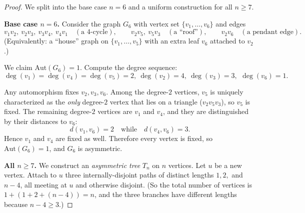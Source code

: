 \documentclass[12pt,a4paper,openany]{book}
\begin{document}
\begin{proof}
We split into the base case $n=6$ and a uniform construction for all $n\ge 7$.

\smallskip
\noindent\textbf{Base case $n=6$.} 
Consider the graph $G_6$ with vertex set $\{v_1,\dots,v_6\}$ and edges
\[
v_1v_2,\ v_2v_3,\ v_3v_4,\ v_4v_1 \quad(\text{a $4$-cycle}),\qquad
v_2v_5,\ v_5v_3 \quad(\text{a ``roof''}),\qquad
v_2v_6\quad(\text{a pendant edge}).
\]
(Equivalently: a ``house'' graph on $\{v_1,\dots,v_5\}$ with an extra leaf $v_6$ attached to $v_2$.)

We claim $\mathrm{Aut}(G_6)=1$. Compute the degree sequence:
\[
\deg(v_1)=\deg(v_4)= \deg(v_5)=2,\ \deg(v_2)=4,\ \deg(v_3)=3,\,\ \deg(v_6)=1.
\]




\vspace{6pt}

Any automorphism fixes $v_2,v_3,v_6$. Among the degree-$2$ vertices, $v_5$ is uniquely
characterized as the \emph{only} degree-$2$ vertex that lies on a triangle ($v_2v_5v_3$),
so $v_5$ is fixed. The remaining degree-$2$ vertices are $v_1$ and $v_4$, and they are
distinguished by their distances to $v_6$:
\[
d(v_1,v_6)=2 \quad\text{while}\quad d(v_4,v_6)=3.
\]
Hence $v_1$ and $v_4$ are fixed as well. Therefore every vertex is fixed, so $\mathrm{Aut}(G_6)=1$,
and $G_6$ is asymmetric.

\smallskip
\noindent\textbf{All $n\ge 7$.} 
We construct an \emph{asymmetric tree} $T_n$ on $n$ vertices. Let $u$ be a new vertex.
Attach to $u$ three internally-disjoint paths of distinct lengths $1,2,$ and $n-4$,
all meeting at $u$ and otherwise disjoint. (So the total number of vertices is
$1+(1+2+(n-4))=n$, and the three branches have different lengths because $n-4\ge 3$.)


\end{proof}
\end{document}
